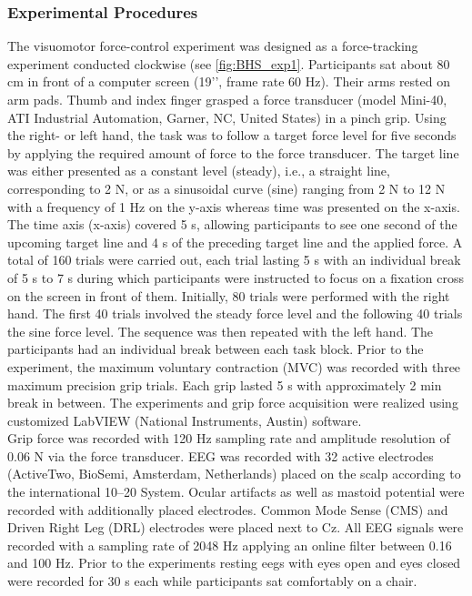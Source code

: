 \subsubsection{Experimental Procedures}
\label{methods:datasets:I:experiment}
The visuomotor force-control experiment was designed as a force-tracking experiment conducted clockwise (see \autoref{fig:BHS_exp1}. Participants sat about 80 cm in front of a computer screen (19’’, frame rate 60 Hz). Their arms rested on arm pads. Thumb and index finger grasped a force transducer (model Mini-40, ATI Industrial Automation, Garner, NC, United States) in a pinch grip. Using the right- or left hand, the task was to follow a target force level for five seconds by applying the required amount of force to the force transducer. The target line was either presented as a constant level (steady), i.e., a straight line, corresponding to 2 N, or as a sinusoidal curve (sine) ranging from 2 N to 12 N with a frequency of 1 Hz on the y-axis whereas time was presented on the x-axis. The time axis (x-axis) covered 5 s, allowing participants to see one second of the upcoming target line and 4 s of the preceding target line and the applied force. A total of 160 trials were carried out, each trial lasting 5 s with an individual break of 5 s to 7 s during which participants were instructed to focus on a fixation cross on the screen in front of them. Initially, 80 trials were performed with the right hand. The first 40 trials involved the steady force level and the following 40 trials the sine force level. The sequence was then repeated with the left hand. The participants had an individual break between each task block. Prior to the experiment, the maximum voluntary contraction (MVC) was recorded with three maximum precision grip trials. Each grip lasted 5 s with approximately 2 min break in between. The experiments and grip force acquisition were realized using customized LabVIEW (National Instruments, Austin) software.\\
Grip force was recorded with 120 Hz sampling rate and amplitude resolution of 0.06 N via the force transducer.
EEG was recorded with 32 active electrodes (ActiveTwo, BioSemi, Amsterdam, Netherlands) placed on the scalp according to the international 10–20 System. Ocular artifacts as well as mastoid potential were recorded with additionally placed electrodes. Common Mode Sense (CMS) and Driven Right Leg (DRL) electrodes were placed next to Cz. All EEG signals were recorded with a sampling rate of 2048 Hz applying an online filter between 0.16 and 100 Hz. Prior to the experiments resting \glspl{eeg} with eyes open and eyes closed were recorded for 30 s each while participants sat comfortably on a chair.

